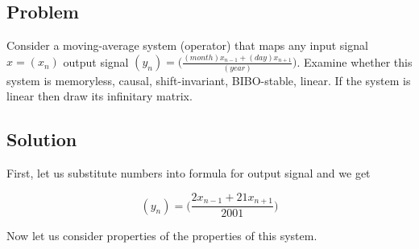 \documentclass{article}
\begin{document}
\subsection{Problem}
Consider a moving-average system (operator) that maps any input signal $x=(x_n)$ output signal $(y_n)=\Big(\frac{(month)x_{n-1}+(day)x_{n+1}}{(year)}\Big)$. Examine whether this system is memoryless, causal, shift-invariant, BIBO-stable, linear. If the system is linear then draw its infinitary matrix.

\subsection{Solution}

First, let us substitute numbers into formula for output signal and we get

$$(y_n)=\Big(\frac{2x_{n-1}+21x_{n+1}}{2001}\Big)$$

Now let us consider properties of the properties of this system.
\end{document}
